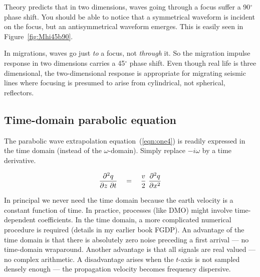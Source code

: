 
\par
Theory predicts that in two dimensions,
waves going through a focus
suffer a 90$^\circ$ phase shift.
You should be able to notice that a symmetrical waveform
is incident on the focus, but an antisymmetrical waveform emerges.
This is easily seen in Figure~\ref{fig:Mhi45b90}.

\par
In migrations, waves go just {\em  to} a focus, not {\em  through} it.
So the migration impulse response in two dimensions
carries a 45$^\circ$ phase shift.
Even though real life is three dimensional,
the two-dimensional response is appropriate
for migrating seismic lines where focusing
is presumed to arise from cylindrical, not spherical, reflectors.



\subsection{Time-domain parabolic equation}

The parabolic wave extrapolation
equation~(\ref{eqn:one4}) is readily
expressed in the time domain (instead of the $\omega$-domain).
Simply replace $-i\omega$ by a time derivative.

\begin{equation}
{\partial^2 q  \over \partial z \,\, \partial t} 
\quad = \quad
{v \over 2} \   {\partial^2 q  \over \partial x^2}
\label{eqn:tdparax}
\end{equation}

In principal we never need the time domain because the earth velocity
is a constant function of time.
In practice, processes (like DMO) might involve time-dependent coefficients.
In the time domain, a more complicated numerical procedure is required
(details in my earlier book FGDP).
An advantage of the time domain is
that there is absolutely zero noise preceding
a first arrival --- no time-domain wraparound.
Another advantage is that all signals are real valued --- no complex arithmetic.
A disadvantage arises when the $t$-axis
is not sampled densely enough --- the propagation velocity becomes 
frequency dispersive.


